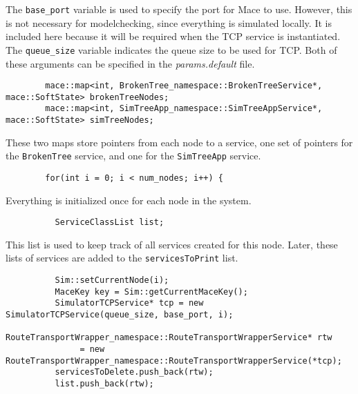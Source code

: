 \documentclass[12pt,letterpaper]{article}
\newenvironment{code}
{\begin{list}{}{\setlength{\leftmargin}{1em}}\item\scriptsize\bfseries}
{\end{list}}
\begin{document}
The \texttt{base\_port} variable is used to specify the port for Mace to use.  However, this is not necessary for modelchecking, since everything is simulated locally.  It is included here because it will be required when the TCP service is instantiated.  The \texttt{queue\_size} variable indicates the queue size to be used for TCP.  Both of these arguments can be specified in the \emph{params.default} file.

\begin{code}
\begin{verbatim} 
        mace::map<int, BrokenTree_namespace::BrokenTreeService*, mace::SoftState> brokenTreeNodes;
        mace::map<int, SimTreeApp_namespace::SimTreeAppService*, mace::SoftState> simTreeNodes;
\end{verbatim}
\end{code}

These two maps store pointers from each node to a service, one set of pointers for the \texttt{BrokenTree} service, and one for the \texttt{SimTreeApp} service.

\begin{code}
\begin{verbatim} 
        for(int i = 0; i < num_nodes; i++) {
\end{verbatim}
\end{code}

Everything is initialized once for each node in the system.

\begin{code}
\begin{verbatim} 
          ServiceClassList list;
\end{verbatim}
\end{code}

This list is used to keep track of all services created for this node.  Later, these lists of services are added to the \texttt{servicesToPrint} list.

\begin{code}
\begin{verbatim} 
          Sim::setCurrentNode(i);
          MaceKey key = Sim::getCurrentMaceKey();
          SimulatorTCPService* tcp = new SimulatorTCPService(queue_size, base_port, i);
          RouteTransportWrapper_namespace::RouteTransportWrapperService* rtw 
               = new RouteTransportWrapper_namespace::RouteTransportWrapperService(*tcp);
          servicesToDelete.push_back(rtw);
          list.push_back(rtw);
\end{verbatim}
\end{code}
\end{document}
